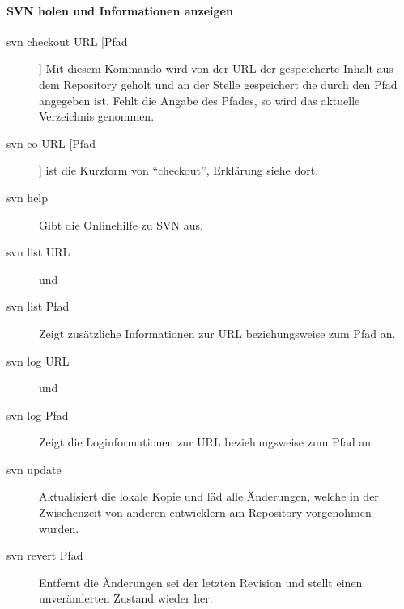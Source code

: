 \paragraph[SVN holen und Informationen anzeigen]{SVN holen und Informationen anzeigen}
\begin{description}
	\item[svn checkout URL [Pfad] ] Mit diesem Kommando wird von der URL der gespeicherte Inhalt aus dem Repository geholt und an der Stelle gespeichert die durch den Pfad angegeben ist. Fehlt die Angabe des Pfades, so wird das aktuelle Verzeichnis genommen.
\end{description}	
\begin{description}
	\item[svn co URL [Pfad] ] ist die Kurzform von "`checkout"', Erklärung siehe dort.
\end{description}	
\begin{description}
	\item[svn help ] Gibt die Onlinehilfe zu SVN aus.
\end{description}	
\begin{description}
	\item[svn list URL] und
	\item[svn list Pfad ] Zeigt zusätzliche Informationen zur URL beziehungsweise zum Pfad an.
\end{description}	
\begin{description}
	\item[svn log URL] und
	\item[svn log Pfad ] Zeigt die Loginformationen zur URL beziehungsweise zum Pfad an.
\end{description}
\begin{description}
	\item[svn update] Aktualisiert die lokale Kopie und läd alle Änderungen, welche in der Zwischenzeit von anderen entwicklern am Repository vorgenohmen wurden.
\end{description}	
\begin{description}
	\item[svn revert Pfad] Entfernt die Änderungen sei der letzten Revision und stellt einen unveränderten Zustand wieder her. 
\end{description}	


